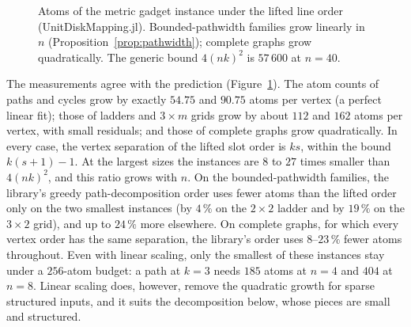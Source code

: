 \documentclass[a4paper,fleqn]{cas-sc}
\begin{document}
\begin{figure}[tb]
\centering
{}
\caption{Atoms of the metric gadget instance under the lifted line order
(UnitDiskMapping.jl). Bounded-pathwidth families grow linearly in $n$
(Proposition~\ref{prop:pathwidth}); complete graphs grow quadratically. The generic
bound $4(nk)^2$ is $57\,600$ at $n=40$.}
\label{fig:scaling}
\end{figure}

The measurements agree with the prediction (Figure~\ref{fig:scaling}). The atom
counts of paths and cycles grow by exactly $54.75$ and $90.75$ atoms per vertex (a
perfect linear fit); those of ladders and $3\times m$ grids grow by about $112$ and
$162$ atoms per vertex, with small residuals; and those of complete graphs grow
quadratically. In every case, the vertex separation of the lifted slot order is $ks$,
within the bound $k(s+1)-1$. At the largest sizes the instances are $8$ to $27$ times
smaller than $4(nk)^2$, and this ratio grows with $n$. On the bounded-pathwidth
families, the library's greedy path-decomposition order uses fewer atoms than the
lifted order only on the two smallest instances (by $4\,\%$ on the $2\times2$ ladder
and by $19\,\%$ on the $3\times2$ grid), and up to $24\,\%$ more elsewhere. On complete
graphs, for which every vertex order has the same separation, the library's order
uses $8$--$23\,\%$ fewer atoms throughout. Even with linear scaling, only the smallest
of these instances stay under a $256$-atom budget: a path at $k=3$ needs $185$ atoms at
$n=4$ and $404$ at $n=8$. Linear scaling does, however, remove the quadratic growth for
sparse structured inputs, and it suits the decomposition below, whose pieces are
small and structured.
\end{document}
